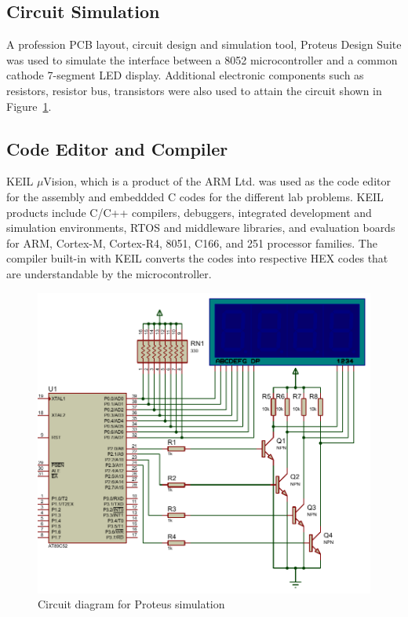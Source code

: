 \documentclass{lab_sheet}
\begin{document}
    \subsection{Circuit Simulation}
    A profession PCB layout, circuit design and simulation tool, Proteus Design Suite was used to simulate the interface between a 8052 microcontroller and a common cathode 7-segment LED display. Additional electronic components such as resistors, resistor bus, transistors were also used to attain the circuit shown in Figure~\ref{fig:proteus}.
    \subsection{Code Editor and Compiler}
    KEIL $\mu$Vision, which is a product of the ARM Ltd. was used as the code editor for the assembly and embeddded C codes for the different lab problems. KEIL products include C/C++ compilers, debuggers, integrated development and simulation environments, RTOS and
    middleware libraries, and evaluation boards for ARM, Cortex-M, Cortex-R4, 8051, C166, and 251 processor families. The compiler built-in with KEIL converts the codes into respective HEX codes that are understandable by the microcontroller.
    \begin{figure}[H]
        \centering
        \includegraphics[scale=0.9]{../Figures/proteus}
        \caption{Circuit diagram for Proteus simulation}
        \label{fig:proteus}
    \end{figure}
\end{document}

